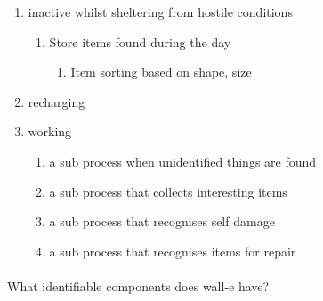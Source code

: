 \documentclass[11pt]{book}
\begin{document}
\begin{enumerate}
\item inactive whilst sheltering from hostile conditions
  \begin{enumerate}
  \item Store items found during the day
     \begin{enumerate}
     \item Item sorting based on shape, size
     \end{enumerate}
  \end{enumerate}
\item recharging
\item working
  \begin{enumerate}
  \item a sub process when unidentified things are found
  \item a sub process that collects interesting items
  \item a sub process that recognises self damage
  \item a sub process that recognises items for repair
  \end{enumerate}
\end{enumerate}

\paragraph{} What identifiable components does wall-e have?
\end{document}
